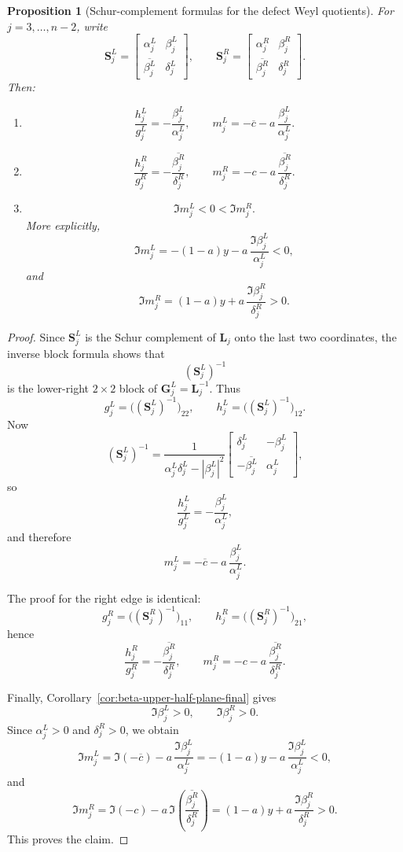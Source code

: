 \documentclass[11pt]{article}
\newtheorem{proposition}[theorem]{Proposition}
\begin{document}
\begin{proposition}[Schur-complement formulas for the defect Weyl quotients]\label{prop:mLR-schur-formulas-final}
For \(j=3,\dots,n-2\), write
\[
\mathbf S_j^L=
\begin{bmatrix}
\alpha_j^L&\beta_j^L\\
\overline{\beta_j^L}&\delta_j^L
\end{bmatrix},
\qquad
\mathbf S_j^R=
\begin{bmatrix}
\alpha_j^R&\beta_j^R\\
\overline{\beta_j^R}&\delta_j^R
\end{bmatrix}.
\]
Then:
\begin{enumerate}
\item
\[
\frac{h_j^L}{g_j^L}=-\frac{\beta_j^L}{\alpha_j^L},
\qquad
m_j^L=-\overline c-a\,\frac{\beta_j^L}{\alpha_j^L}.
\]

\item
\[
\frac{h_j^R}{g_j^R}=-\frac{\overline{\beta_j^R}}{\delta_j^R},
\qquad
m_j^R=-c-a\,\frac{\overline{\beta_j^R}}{\delta_j^R}.
\]

\item
\[
\Im m_j^L<0<\Im m_j^R.
\]
More explicitly,
\[
\Im m_j^L=-(1-a)y-a\,\frac{\Im\beta_j^L}{\alpha_j^L}<0,
\]
and
\[
\Im m_j^R=(1-a)y+a\,\frac{\Im\beta_j^R}{\delta_j^R}>0.
\]
\end{enumerate}
\end{proposition}

\begin{proof}
Since \(\mathbf S_j^L\) is the Schur complement of \(\mathbf L_j\) onto the last two coordinates,
the inverse block formula shows that
\[
(\mathbf S_j^L)^{-1}
\]
is the lower-right \(2\times 2\) block of \(\mathbf G_j^L=\mathbf L_j^{-1}\). Thus
\[
g_j^L=\bigl((\mathbf S_j^L)^{-1}\bigr)_{22},
\qquad
h_j^L=\bigl((\mathbf S_j^L)^{-1}\bigr)_{12}.
\]
Now
\[
(\mathbf S_j^L)^{-1}
=
\frac{1}{\alpha_j^L\delta_j^L-|\beta_j^L|^2}
\begin{bmatrix}
\delta_j^L&-\beta_j^L\\
-\overline{\beta_j^L}&\alpha_j^L
\end{bmatrix},
\]
so
\[
\frac{h_j^L}{g_j^L}=-\frac{\beta_j^L}{\alpha_j^L},
\]
and therefore
\[
m_j^L=-\overline c-a\,\frac{\beta_j^L}{\alpha_j^L}.
\]

The proof for the right edge is identical:
\[
g_j^R=\bigl((\mathbf S_j^R)^{-1}\bigr)_{11},
\qquad
h_j^R=\bigl((\mathbf S_j^R)^{-1}\bigr)_{21},
\]
hence
\[
\frac{h_j^R}{g_j^R}=-\frac{\overline{\beta_j^R}}{\delta_j^R},
\qquad
m_j^R=-c-a\,\frac{\overline{\beta_j^R}}{\delta_j^R}.
\]

Finally, Corollary~\ref{cor:beta-upper-half-plane-final} gives
\[
\Im\beta_j^L>0,
\qquad
\Im\beta_j^R>0.
\]
Since \(\alpha_j^L>0\) and \(\delta_j^R>0\), we obtain
\[
\Im m_j^L
=
\Im(-\overline c)-a\,\frac{\Im\beta_j^L}{\alpha_j^L}
=
-(1-a)y-a\,\frac{\Im\beta_j^L}{\alpha_j^L}
<0,
\]
and
\[
\Im m_j^R
=
\Im(-c)-a\,\Im\!\left(\frac{\overline{\beta_j^R}}{\delta_j^R}\right)
=
(1-a)y+a\,\frac{\Im\beta_j^R}{\delta_j^R}
>0.
\]
This proves the claim.
\end{proof}
\end{document}
